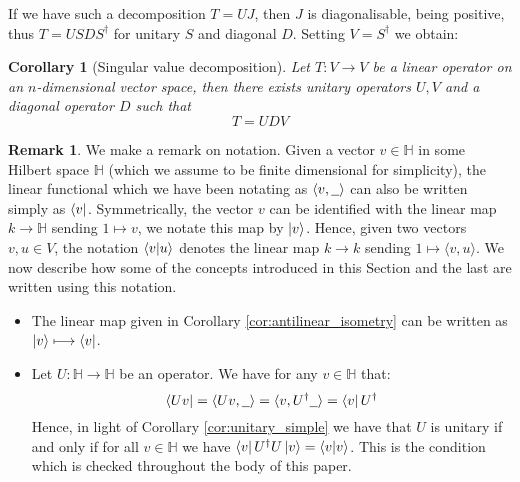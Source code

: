\documentclass[12pt]{article}
\theoremstyle{plain}
\newtheorem{cor}[thm]{Corollary}
\theoremstyle{definition}
\newtheorem{remark}[thm]{Remark}
\newcommand{\bb}[1]{\mathbb{#1}}
\newcommand{\und}[1]{\underline{\hspace{#1 cm}}}
\newcommand{\lto}{\longrightarrow}
\begin{document}
If we have such a decomposition $T = UJ$, then $J$ is diagonalisable, being positive, thus $T = USDS^\dagger$ for unitary $S$ and diagonal $D$. Setting $V = S^\dagger$ we obtain:
\begin{cor}[Singular value decomposition]
	Let $T: V \lto V$ be a linear operator on an $n$-dimensional vector space, then there exists unitary operators $U,V$ and a diagonal operator $D$ such that
	\begin{equation}
		T = UDV
	\end{equation}
\end{cor}

\begin{remark}\label{rmk:notation_bra_ket}
	We make a remark on notation. Given a vector $v \in \bb{H}$ in some Hilbert space $\bb{H}$ (which we assume to be finite dimensional for simplicity), the linear functional which we have been notating as $\langle v, \und{0.2}\rangle$ can also be written simply as $\bra{v}$. Symmetrically, the vector $v$ can be identified with the linear map $k \lto \bb{H}$ sending $1 \longmapsto v$, we notate this map by $\ket{v}$. Hence, given two vectors $v,u \in V$, the notation $\bra{v}\ket{u}$ denotes the linear map $k \lto k$ sending $1 \longmapsto \langle v, u \rangle$. We now describe how some of the concepts introduced in this Section and the last are written using this notation.
	\begin{itemize}
		\item The linear map given in Corollary \ref{cor:antilinear_isometry} can be written as $\ket{v} \longmapsto \bra{v}$.
		\item Let $U: \bb{H} \lto \bb{H}$ be an operator. We have for any $v \in \bb{H}$ that:
		\begin{equation}
			\bra{ Uv} = \langle Uv, \und{0.2}\rangle = \langle v, U^\dagger \und{0.2}\rangle = \bra{v}U^\dagger
		\end{equation}
		Hence, in light of Corollary \ref{cor:unitary_simple} we have that $U$ is unitary if and only if for all $v \in \bb{H}$ we have $\bra{v}U^\dagger U \ket{v} = \bra{v}\ket{v}$. This is the condition which is checked throughout the body of this paper.
	\end{itemize}
\end{remark}
\end{document}
